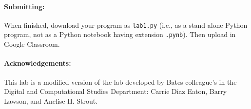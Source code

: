 \documentclass[10pt]{article}
\begin{document}
  \paragraph{Submitting:}   When finished, download your program as {\tt lab1.py} (i.e., as a stand-alone Python program, not as a Python notebook having extension {\tt.pynb}). Then upload in Google Classroom.

  \paragraph{Acknowledgements:} This lab is a modified version of the lab developed by Bates colleague's in the Digital and Computational Studies Department: Carrie Diaz Eaton, Barry Lawson, and Anelise H. Strout.
\end{document}
